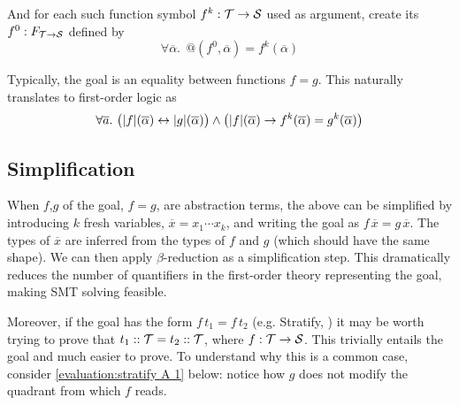 And for each such function symbol $f^k:\mathcal{T}\to\mathcal{S}$ used as argument, create its 
 $f^0:F_{\mathcal{T}\to\mathcal{S}}$ defined by
\begin{equation}
\forall \overline\alpha.~~@(f^0,\overline\alpha)=f^k(\overline\alpha)
\label{automated:reflection}
\end{equation}

Typically, the goal is an equality between functions $f=g$. This naturally translates
to first-order logic as
\[\forall\overline{a}.~\big(|f|(\overline\alpha)\leftrightarrow|g|(\overline\alpha)\big) \land
  \big(|f|(\overline\alpha) \rightarrow f^k(\overline\alpha)=g^k(\overline\alpha)\big)\]
  
\subsection{Simplification}

When $f$,$g$ of the goal, $f=g$, are abstraction terms, the above can be simplified by
introducing $k$ fresh variables, $\overline x=x_1\cdots x_k$, and writing the goal as
$f\,\overline x = g\,\overline x$. The types of $\overline x$ are inferred from the types
of $f$ and $g$ (which should have the same shape). We can then apply $\beta$-reduction as
a simplification step. This dramatically reduces the number of quantifiers in the first-order
theory representing the goal, making SMT solving feasible.

Moreover, if the goal has the form $f\,t_1 = f\,t_2$ (e.g. Stratify, ) it may
be worth trying to prove that $t_1::\mathcal{T} = t_2::\mathcal{T}$, where $f:\mathcal{T}\to\mathcal{S}$.
This trivially entails the goal and much easier to prove. To understand why
this is a common case, consider \eqref{evaluation:stratify A 1} below: 
notice how $g$ does not modify the quadrant from which $f$ reads.
